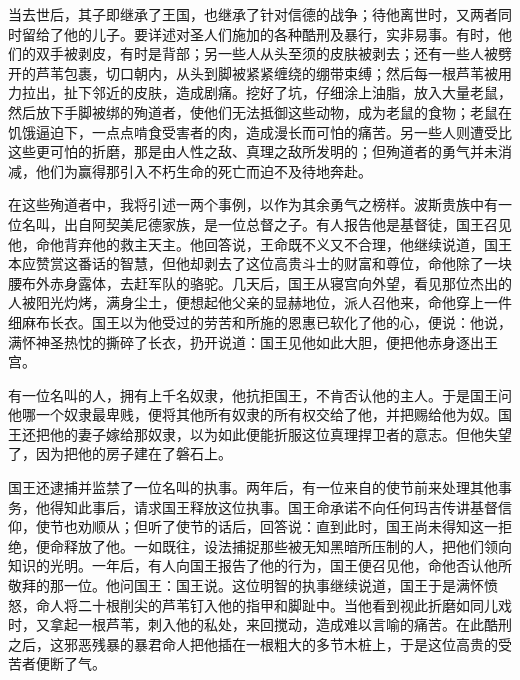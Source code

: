 当去世后，其子即继承了王国，也继承了针对信德的战争；待他离世时，又两者同时留给了他的儿子。要详述对圣人们施加的各种酷刑及暴行，实非易事。有时，他们的双手被剥皮，有时是背部；另一些人从头至须的皮肤被剥去；还有一些人被劈开的芦苇包裹，切口朝内，从头到脚被紧紧缠绕的绷带束缚；然后每一根芦苇被用力拉出，扯下邻近的皮肤，造成剧痛。挖好了坑，仔细涂上油脂，放入大量老鼠，然后放下手脚被绑的殉道者，使他们无法抵御这些动物，成为老鼠的食物；老鼠在饥饿逼迫下，一点点啃食受害者的肉，造成漫长而可怕的痛苦。另一些人则遭受比这些更可怕的折磨，那是由人性之敌、真理之敌所发明的；但殉道者的勇气并未消减，他们为赢得那引入不朽生命的死亡而迫不及待地奔赴。\par

在这些殉道者中，我将引述一两个事例，以作为其余勇气之榜样。波斯贵族中有一位名叫，出自阿契美尼德家族，是一位总督之子。有人报告他是基督徒，国王召见他，命他背弃他的救主天主。他回答说，王命既不义又不合理，他继续说道，国王本应赞赏这番话的智慧，但他却剥去了这位高贵斗士的财富和尊位，命他除了一块腰布外赤身露体，去赶军队的骆驼。几天后，国王从寝宫向外望，看见那位杰出的人被阳光灼烤，满身尘土，便想起他父亲的显赫地位，派人召他来，命他穿上一件细麻布长衣。国王以为他受过的劳苦和所施的恩惠已软化了他的心，便说：他说，满怀神圣热忱的撕碎了长衣，扔开说道：国王见他如此大胆，便把他赤身逐出王宫。\par

有一位名叫的人，拥有上千名奴隶，他抗拒国王，不肯否认他的主人。于是国王问他哪一个奴隶最卑贱，便将其他所有奴隶的所有权交给了他，并把赐给他为奴。国王还把他的妻子嫁给那奴隶，以为如此便能折服这位真理捍卫者的意志。但他失望了，因为把他的房子建在了磐石上。\par

国王还逮捕并监禁了一位名叫的执事。两年后，有一位来自的使节前来处理其他事务，他得知此事后，请求国王释放这位执事。国王命承诺不向任何玛吉传讲基督信仰，使节也劝顺从；但听了使节的话后，回答说：直到此时，国王尚未得知这一拒绝，便命释放了他。一如既往，设法捕捉那些被无知黑暗所压制的人，把他们领向知识的光明。一年后，有人向国王报告了他的行为，国王便召见他，命他否认他所敬拜的那一位。他问国王：国王说。这位明智的执事继续说道，国王于是满怀愤怒，命人将二十根削尖的芦苇钉入他的指甲和脚趾中。当他看到视此折磨如同儿戏时，又拿起一根芦苇，刺入他的私处，来回搅动，造成难以言喻的痛苦。在此酷刑之后，这邪恶残暴的暴君命人把他插在一根粗大的多节木桩上，于是这位高贵的受苦者便断了气。\par

